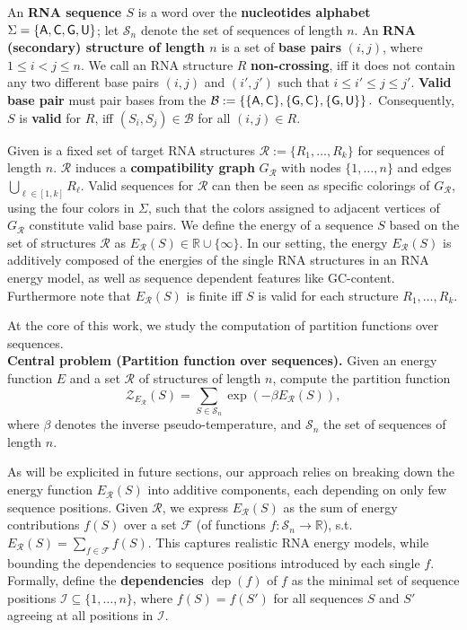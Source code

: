 \documentclass{bioinfo}
\newcommand{\dep}{\operatorname{dep}}
\newcommand{\partfun}[1]{\mathcal{Z}_{#1}}
\newcommand{\real}{\mathbb{R}}
\newcommand{\B}{\mathcal{B}}
\newcommand{\F}{\mathcal{F}}
\newcommand{\I}{\mathcal{I}}
\newcommand{\R}{\mathcal{R}}
\renewcommand{\S}{\mathcal{S}}
\newcommand{\Def}[1]{{\bf #1}}
\newcommand{\TODO}[1]{\Final{\begin{mdframed}[leftline=false,rightline=false,linecolor=red!70!black,linewidth=1.5pt]\color{red!70!black}\sf TODO: #1\end{mdframed}}}
\newcommand{\Final}[1]{#1}
\renewcommand{\Final}[1]{}
\newcommand{\Nuc}[1]{{\sf #1}}
\newcommand{\Ab}{\Nuc{A}}
\newcommand{\Cb}{\Nuc{C}}
\newcommand{\Gb}{\Nuc{G}}
\newcommand{\Ub}{\Nuc{U}}
\begin{document}
An \Def{RNA sequence $S$} is a word over the \Def{nucleotides
  alphabet} $\Sigma=\{\Ab,\Cb,\Gb,\Ub\}$; let $\S_n$ denote the set of
sequences of length $n$. An \Def{RNA (secondary) structure of length
  $n$} is a set of \Def{base pairs} $(i,j)$, where $1\leq i<j\leq
n$. We call an RNA structure $R$ \Def{non-crossing}, iff it does not
contain any two different base pairs $(i,j)$ and $(i',j')$ such that
$i\leq i'\leq j \leq j'.$ \Def{Valid base pair} must pair bases from
the $\B:=\left\{\{\Ab,\Cb\},\{\Gb,\Cb\},\{\Gb,\Ub\}\right\}.$
Consequently, $S$ is \Def{valid} for $R$, iff
$(S_i,S_j)\in \B$ for all $(i,j)\in R$.
%

Given is a fixed set of target RNA structures
$\R:=\{R_1, \dots, R_k\}$ for sequences of length $n$. $\R$ induces a
\Def{compatibility graph}
$G_{\R}$ with nodes $\{1,\dots,n\}$ and edges $\bigcup_{\ell\in[1,k]} R_\ell$. Valid
sequences for $\R$ can then be seen as specific colorings of $G_{\R}$,
using the four colors in $\Sigma$, such that the colors assigned to
adjacent vertices of $G_{\R}$ constitute valid base pairs.
%
We define the energy of a sequence $S$ based on the set of structures
$\R$ as $E_\R(S) \in \mathbb{R}\cup\{\infty\}$. In
our setting, the energy $E_\R(S)$ is additively composed of
the energies of the single RNA structures in an RNA energy model, as
well as sequence dependent features like \Gb\Cb-content.  Furthermore note
that $E_\R(S)$ is finite iff $S$ is valid for each structure
$R_1,\dots,R_k$.

At the core of this work, we study the computation of partition
functions over sequences.\smallskip\\
\textbf{Central problem (Partition function over sequences).}
  Given an energy function $E$ and a set $\R$ of structures of length $n$, compute the
  partition function
  \begin{equation}
    \label{eq:mainproblem}
    \partfun{E_\R}(S) = \sum_{S\in\S_n} \exp(-\beta E_\R(S)),
  \end{equation}
  where $\beta$ denotes the inverse pseudo-temperature, and $\S_n$ the set of sequences of length $n$.

%
As will be explicited in future sections, our approach relies on breaking down the energy function $E_\R(S)$ into additive components, each depending on only few sequence positions. Given $\R$, we express $E_\R(S)$
as the sum of energy contributions $f(S)$ over a set $\F$ (of
functions $f:\S_n\to\real$), s.t.~$E_\R(S)=\sum_{f\in\F} f(S)$. This
captures realistic RNA energy models, while bounding the
dependencies to sequence positions introduced by each single $f$. Formally, define the \Def{dependencies} $\dep(f)$ of $f$ as the minimal set of sequence positions $\I\subseteq\{1,\dots,n\}$, where $f(S)=f(S')$ for all sequences $S$ and $S'$ agreeing at all positions in $\I$.
\end{document}
